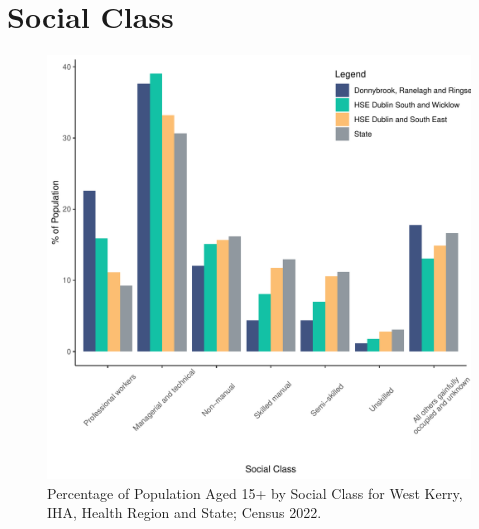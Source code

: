 \documentclass{article}
\begin{document}
\section{Social Class}\label{sect:SC}
\begin{figure}[H]
	\centering
	\includegraphics[width = 140mm]{../figures/SocialClassED.pdf}
	\caption{Percentage of Population Aged 15+ by Social Class for West Kerry, IHA, Health Region and State; Census 2022.}
	\label{fig:vbnv}
	\end{figure}
\end{document}
